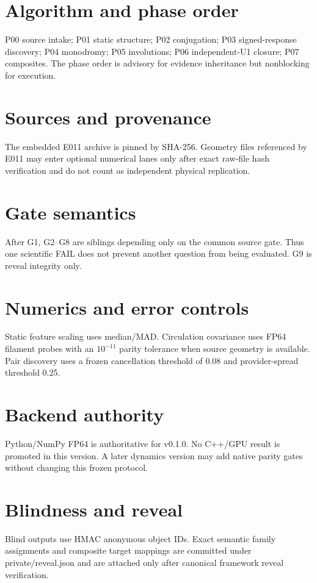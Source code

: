\documentclass[11pt]{article}
\begin{document}
\section{Algorithm and phase order}
P00 source intake; P01 static structure; P02 conjugation; P03 signed-response discovery; P04 monodromy; P05 involutions; P06 independent-U1 closure; P07 composites. The phase order is advisory for evidence inheritance but nonblocking for execution.
\section{Sources and provenance}
The embedded E011 archive is pinned by SHA-256. Geometry files referenced by E011 may enter optional numerical lanes only after exact raw-file hash verification and do not count as independent physical replication.
\section{Gate semantics}
After G1, G2--G8 are siblings depending only on the common source gate. Thus one scientific FAIL does not prevent another question from being evaluated. G9 is reveal integrity only.
\section{Numerics and error controls}
Static feature scaling uses median/MAD. Circulation covariance uses FP64 filament probes with an $10^{-11}$ parity tolerance when source geometry is available. Pair discovery uses a frozen cancellation threshold of 0.08 and provider-spread threshold 0.25.
\section{Backend authority}
Python/NumPy FP64 is authoritative for v0.1.0. No C++/GPU result is promoted in this version. A later dynamics version may add native parity gates without changing this frozen protocol.
\section{Blindness and reveal}
Blind outputs use HMAC anonymous object IDs. Exact semantic family assignments and composite target mappings are committed under private/reveal.json and are attached only after canonical framework reveal verification.
\end{document}
